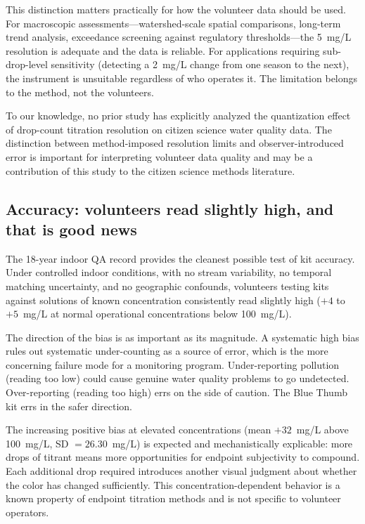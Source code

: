 \documentclass[lineno]{wlpeerj}
\begin{document}
This distinction matters practically for how the volunteer data should be used. For macroscopic assessments---watershed-scale spatial comparisons, long-term trend analysis, exceedance screening against regulatory thresholds---the 5~mg/L resolution is adequate and the data is reliable. For applications requiring sub-drop-level sensitivity (detecting a 2~mg/L change from one season to the next), the instrument is unsuitable regardless of who operates it. The limitation belongs to the method, not the volunteers.

To our knowledge, no prior study has explicitly analyzed the quantization effect of drop-count titration resolution on citizen science water quality data. The distinction between method-imposed resolution limits and observer-introduced error is important for interpreting volunteer data quality and may be a contribution of this study to the citizen science methods literature.

\subsection{Accuracy: volunteers read slightly high, and that is good news}

The 18-year indoor QA record provides the cleanest possible test of kit accuracy. Under controlled indoor conditions, with no stream variability, no temporal matching uncertainty, and no geographic confounds, volunteers testing kits against solutions of known concentration consistently read slightly high ($+4$ to $+5$~mg/L at normal operational concentrations below 100~mg/L).

The direction of the bias is as important as its magnitude. A systematic high bias rules out systematic under-counting as a source of error, which is the more concerning failure mode for a monitoring program. Under-reporting pollution (reading too low) could cause genuine water quality problems to go undetected. Over-reporting (reading too high) errs on the side of caution. The Blue Thumb kit errs in the safer direction.

The increasing positive bias at elevated concentrations (mean $+32$~mg/L above 100~mg/L, SD $= 26.30$~mg/L) is expected and mechanistically explicable: more drops of titrant means more opportunities for endpoint subjectivity to compound. Each additional drop required introduces another visual judgment about whether the color has changed sufficiently. This concentration-dependent behavior is a known property of endpoint titration methods and is not specific to volunteer operators.
\end{document}
